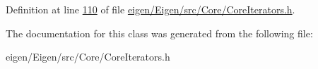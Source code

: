 Definition at line \hyperlink{eigen_2_eigen_2src_2_core_2_core_iterators_8h_source_l00110}{110} of file \hyperlink{eigen_2_eigen_2src_2_core_2_core_iterators_8h_source}{eigen/\+Eigen/src/\+Core/\+Core\+Iterators.\+h}.



The documentation for this class was generated from the following file\+:\begin{DoxyCompactItemize}
\item 
eigen/\+Eigen/src/\+Core/\+Core\+Iterators.\+h\end{DoxyCompactItemize}
